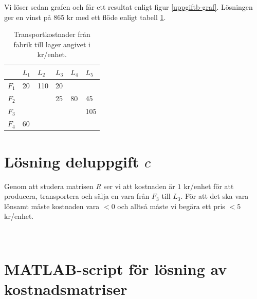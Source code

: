 \documentclass[titlepage, a4paper]{article}
\begin{document}
Vi löser sedan grafen och får ett resultat enligt figur \ref{uppgiftb-graf}. Lösningen ger en vinst på 865 kr med ett flöde enligt tabell \ref{uppgiftb-flode}.

\begin{table}[h!]
    \centering
    \begin{tabular}{ | l | l | l | l | l | l | }
        \hline
        {} & {$L_{1}$} & {$L_{2}$} & {$L_{3}$} & {$L_{4}$} & {$L_{5}$} \\\hline
        {$F_{1}$} & {20} & {110} & {20} & {} & {} \\\hline
        {$F_{2}$} & {} & {} & {25} & {80} & {45} \\\hline
        {$F_{3}$} & {} & {} & {} & {} & {105} \\\hline
        {$F_{4}$} & {60} & {} & {} & {} & {} \\\hline
    \end{tabular}
    \caption{Transportkostnader från fabrik till lager angivet i kr/enhet.} \label{uppgiftb-flode}
\end{table}

\section{Lösning deluppgift $c$}

Genom att studera matrisen $R$ ser vi att kostnaden är $1$ kr/enhet för att producera, transportera och sälja en vara från $F_{3}$ till $L_{3}$. För att det ska vara lönsamt måste kostnaden vara $<0$ och alltså måste vi begära ett pris $<5$ kr/enhet.

\newpage
\begin{appendices}
{\ }\vspace{1mm}
\section{MATLAB-script för lösning av kostnadsmatriser}

\end{appendices}
\end{document}
